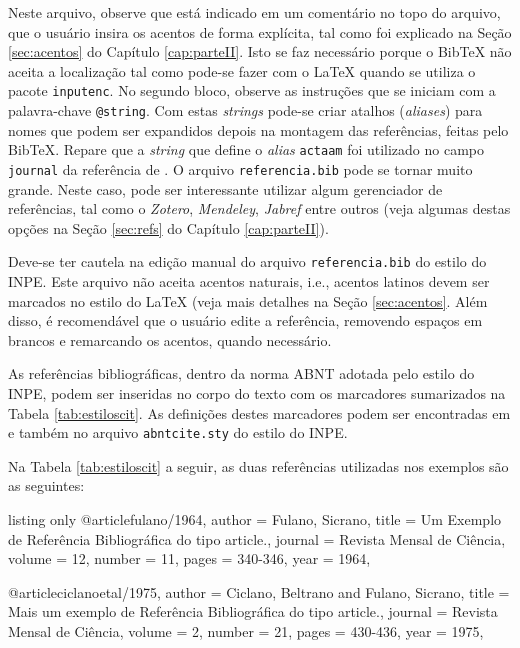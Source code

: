 Neste arquivo, observe que está indicado em um comentário no topo do arquivo, que o usuário insira os acentos de forma explícita, tal como foi explicado na Seção \ref{sec:acentos} do Capítulo \ref{cap:parteII}. Isto se faz necessário porque o Bib\TeX{} não aceita a localização tal como pode-se fazer com o \LaTeX{} quando se utiliza o pacote {\tt inputenc}. No segundo bloco, observe as instruções que se iniciam com a palavra-chave {\tt @string}. Com estas \textit{strings} pode-se criar atalhos (\textit{aliases}) para nomes que podem ser expandidos depois na montagem das referências, feitas pelo Bib\TeX{}. Repare que a \textit{string} que define o \textit{alias} {\tt actaam} foi utilizado no campo {\tt journal} da referência de . O arquivo {\tt referencia.bib} pode se tornar muito grande. Neste caso, pode ser interessante utilizar algum gerenciador de referências, tal como o \textit{Zotero}, \textit{Mendeley}, \textit{Jabref} entre outros (veja algumas destas opções na Seção \ref{sec:refs} do Capítulo \ref{cap:parteII}). 

\begin{marker}
Deve-se ter cautela na edição manual do arquivo {\tt referencia.bib} do estilo do INPE. Este arquivo não aceita acentos naturais, i.e., acentos latinos devem ser marcados no estilo do \LaTeX{} (veja mais detalhes na Seção \ref{sec:acentos}. Além disso, é recomendável que o usuário edite a referência, removendo espaços em brancos e remarcando os acentos, quando necessário.
\end{marker}

As referências bibliográficas, dentro da norma ABNT adotada pelo estilo do INPE, podem ser inseridas no corpo do texto com os marcadores sumarizados na Tabela \ref{tab:estiloscit}. As definições destes marcadores podem ser encontradas em  e também no arquivo {\tt abntcite.sty} do estilo do INPE.

Na Tabela \ref{tab:estiloscit} a seguir, as duas referências utilizadas nos exemplos são as seguintes:

\begin{texexp}{listing only}
@article{fulano/1964,
  author = {Fulano, Sicrano},
  title = {Um Exemplo de Refer{\^e}ncia Bibliogr{\'a}fica do tipo article.},
  journal = {Revista Mensal de Ci{\^e}ncia},
  volume = {12},
  number = {11},
  pages = {340-346},
  year = {1964},
}

@article{ciclanoetal/1975,
  author = {Ciclano, Beltrano and Fulano, Sicrano},
  title = {Mais um exemplo de Refer{\^e}ncia Bibliogr{\'a}fica do tipo article.},
  journal = {Revista Mensal de Ci{\^e}ncia},
  volume = {2},
  number = {21},
  pages = {430-436},
  year = {1975},
}
\end{texexp}

